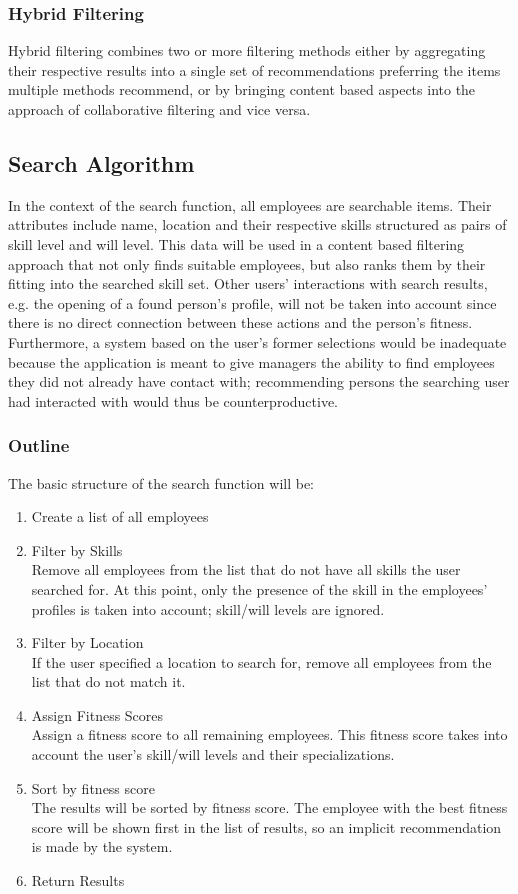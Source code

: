 \subsubsection{Hybrid Filtering}
Hybrid filtering combines two or more filtering methods either by aggregating their respective results into a single set of recommendations preferring the items multiple methods recommend, or by bringing content based aspects into the approach of collaborative filtering and vice versa.

\subsection{Search Algorithm}
In the context of the search function, all employees are searchable items. Their attributes include name, location and their respective skills structured as pairs of skill level and will level. This data will be used in a content based filtering approach that not only finds suitable employees, but also ranks them by their fitting into the searched skill set. Other users' interactions with search results, e.g. the opening of a found person's profile, will not be taken into account since there is no direct connection between these actions and the person's fitness. Furthermore, a system based on the user's former selections would be inadequate because the application is meant to give managers the ability to find employees they did not already have contact with; recommending persons the searching user had interacted with would thus be counterproductive.

\subsubsection{Outline}
The basic structure of the search function will be:
\begin{enumerate}
  \item Create a list of all employees
  \item Filter by Skills\\
    Remove all employees from the list that do not have all skills the user searched for. At this point, only the presence of the skill in the employees' profiles is taken into account; skill/will levels are ignored.
  \item Filter by Location\\
    If the user specified a location to search for, remove all employees from the list that do not match it.
  \item Assign Fitness Scores\\
    Assign a fitness score to all remaining employees. This fitness score takes into account the user's skill/will levels and their specializations.
  \item Sort by fitness score\\
    The results will be sorted by fitness score. The employee with the best fitness score will be shown first in the list of results, so an implicit recommendation
    is made by the system.
  \item Return Results
\end{enumerate}

